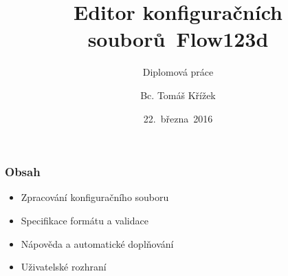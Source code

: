 





\title[Editor konfiguračních souborů~Flow123d]{Editor konfiguračních souborů~Flow123d}
\subtitle{Diplomová práce}
\author[Bc. Tomáš Křížek]{Bc. Tomáš Křížek}
\date{22.~března~2016}
\newcommand{\TextTitulniStranaPodLinkou}{\tiny
Studentská 2 {\color{FM_TUL} |} 461\,17 Liberec 2 {\color{FM_TUL} |} {tomas.krizek1@tul.cz} {\color{FM_TUL} |} 
\href{http://www.fm.tul.cz/}{www.fm.tul.cz}}




\begin{frame}
	\titlepage
\end{frame}

\begin{frame}
	\frametitle{Obsah}
	\begin{itemize}
		\item Zpracování konfiguračního souboru
		\item Specifikace formátu a validace
		\item Nápověda a automatické doplňování
		\item Uživatelské rozhraní
	\end{itemize}
\end{frame}

